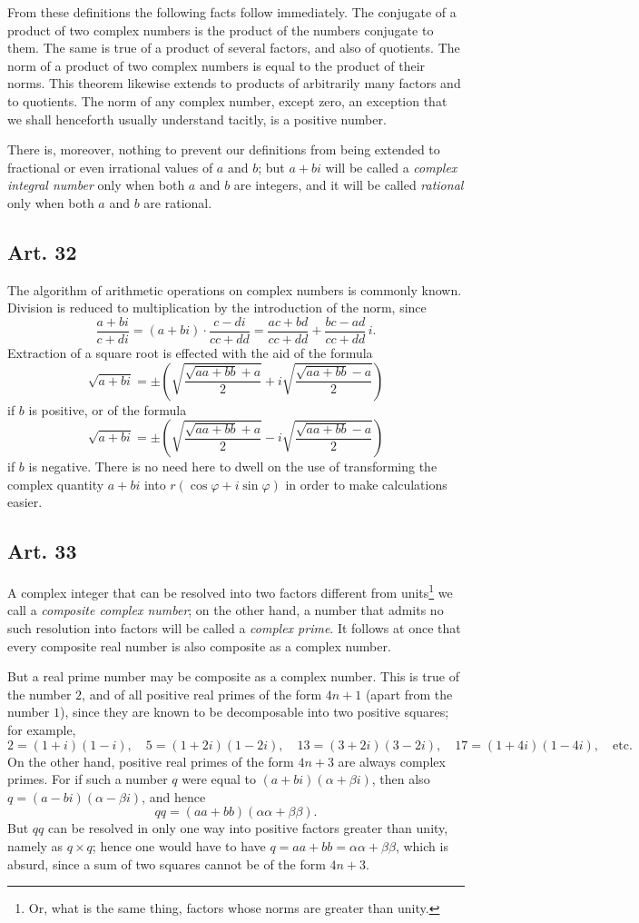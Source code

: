 \documentclass[12pt]{article}
\newcommand{\art}[1]{\subsection*{Art. #1}}
\begin{document}
From these definitions the following facts follow immediately. The conjugate of a product of two complex numbers is the product of the numbers conjugate to them. The same is true of a product of several factors, and also of quotients. The norm of a product of two complex numbers is equal to the product of their norms. This theorem likewise extends to products of arbitrarily many factors and to quotients. The norm of any complex number, except zero, an exception that we shall henceforth usually understand tacitly, is a positive number.

There is, moreover, nothing to prevent our definitions from being extended to fractional or even irrational values of $a$ and $b$; but $a+bi$ will be called a \textit{complex integral number} only when both $a$ and $b$ are integers, and it will be called \textit{rational} only when both $a$ and $b$ are rational.

\art{32}

The algorithm of arithmetic operations on complex numbers is commonly known. Division is reduced to multiplication by the introduction of the norm, since
\[
\frac{a+bi}{c+di}=(a+bi)\cdot\frac{c-di}{cc+dd}=\frac{ac+bd}{cc+dd}+\frac{bc-ad}{cc+dd}\,i.
\]
Extraction of a square root is effected with the aid of the formula
\[
\sqrt{a+bi}=\pm\left(\sqrt{\frac{\sqrt{aa+bb}+a}{2}}+i\sqrt{\frac{\sqrt{aa+bb}-a}{2}}\right)
\]
if $b$ is positive, or of the formula
\[
\sqrt{a+bi}=\pm\left(\sqrt{\frac{\sqrt{aa+bb}+a}{2}}-i\sqrt{\frac{\sqrt{aa+bb}-a}{2}}\right)
\]
if $b$ is negative. There is no need here to dwell on the use of transforming the complex quantity $a+bi$ into $r(\cos\varphi+i\sin\varphi)$ in order to make calculations easier.

\art{33}

A complex integer that can be resolved into two factors different from units\footnote{Or, what is the same thing, factors whose norms are greater than unity.} we call a \textit{composite complex number}; on the other hand, a number that admits no such resolution into factors will be called a \textit{complex prime}. It follows at once that every composite real number is also composite as a complex number.

But a real prime number may be composite as a complex number. This is true of the number $2$, and of all positive real primes of the form $4n+1$ (apart from the number $1$), since they are known to be decomposable into two positive squares; for example,
\[
2=(1+i)(1-i),\quad 5=(1+2i)(1-2i),\quad 13=(3+2i)(3-2i),\quad 17=(1+4i)(1-4i),\quad \text{etc.}
\]
On the other hand, positive real primes of the form $4n+3$ are always complex primes. For if such a number $q$ were equal to $(a+bi)(\alpha+\beta i)$, then also $q=(a-bi)(\alpha-\beta i)$, and hence
\[
qq=(aa+bb)(\alpha\alpha+\beta\beta).
\]
But $qq$ can be resolved in only one way into positive factors greater than unity, namely as $q\times q$; hence one would have to have $q=aa+bb=\alpha\alpha+\beta\beta$, which is absurd, since a sum of two squares cannot be of the form $4n+3$.
\end{document}
